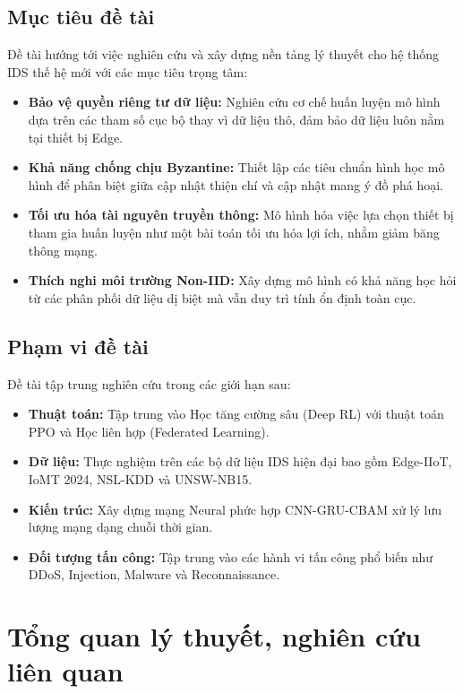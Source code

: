 \documentclass[12pt,a4paper]{article}
\begin{document}
\subsection{Mục tiêu đề tài}
Đề tài hướng tới việc nghiên cứu và xây dựng nền tảng lý thuyết cho hệ thống IDS thế hệ mới với các mục tiêu trọng tâm:
\begin{itemize}
    \item \textbf{Bảo vệ quyền riêng tư dữ liệu:} Nghiên cứu cơ chế huấn luyện mô hình dựa trên các tham số cục bộ thay vì dữ liệu thô, đảm bảo dữ liệu luôn nằm tại thiết bị Edge.
    \item \textbf{Khả năng chống chịu Byzantine:} Thiết lập các tiêu chuẩn hình học mô hình để phân biệt giữa cập nhật thiện chí và cập nhật mang ý đồ phá hoại.
    \item \textbf{Tối ưu hóa tài nguyên truyền thông:} Mô hình hóa việc lựa chọn thiết bị tham gia huấn luyện như một bài toán tối ưu hóa lợi ích, nhằm giảm băng thông mạng.
    \item \textbf{Thích nghi môi trường Non-IID:} Xây dựng mô hình có khả năng học hỏi từ các phân phối dữ liệu dị biệt mà vẫn duy trì tính ổn định toàn cục.
\end{itemize}

\subsection{Phạm vi đề tài}
Đề tài tập trung nghiên cứu trong các giới hạn sau:
\begin{itemize}
    \item \textbf{Thuật toán:} Tập trung vào Học tăng cường sâu (Deep RL) với thuật toán PPO và Học liên hợp (Federated Learning).
    \item \textbf{Dữ liệu:} Thực nghiệm trên các bộ dữ liệu IDS hiện đại bao gồm Edge-IIoT, IoMT 2024, NSL-KDD và UNSW-NB15.
    \item \textbf{Kiến trúc:} Xây dựng mạng Neural phức hợp CNN-GRU-CBAM xử lý lưu lượng mạng dạng chuỗi thời gian.
    \item \textbf{Đối tượng tấn công:} Tập trung vào các hành vi tấn công phổ biến như DDoS, Injection, Malware và Reconnaissance.
\end{itemize}

\section{Tổng quan lý thuyết, nghiên cứu liên quan}
\end{document}
